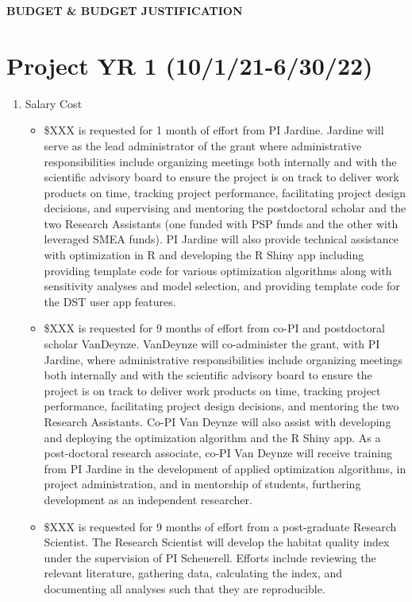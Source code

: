 \begin{center} \textbf{BUDGET \& BUDGET JUSTIFICATION} \end{center}


\section{Project YR 1 (10/1/21-6/30/22)}
\begin{enumerate}
\item Salary Cost
\begin{itemize}
\item  \$XXX is requested for 1 month of effort from PI Jardine. Jardine will serve as the lead administrator of the grant where administrative responsibilities include organizing meetings both internally and with the scientific advisory board to ensure the project is on track to deliver work products on time, tracking project performance, facilitating project design decisions, and supervising and mentoring the postdoctoral scholar and the two Research Assistants (one funded with PSP funds and the other with leveraged SMEA funds). PI Jardine will also provide technical assistance with optimization in R and developing the R Shiny app including providing template code for various optimization algorithms along with sensitivity analyses and model selection, and providing template code for the DST user app features.
\item \$XXX is requested for 9 months of effort from co-PI and postdoctoral scholar VanDeynze. VanDeynze will co-administer the grant, with PI Jardine, where administrative responsibilities include organizing meetings both internally and with the scientific advisory board to ensure the project is on track to deliver work products on time, tracking project performance, facilitating project design decisions, and mentoring the two Research Assistants. Co-PI Van Deynze will also assist with developing and deploying the optimization algorithm and the R Shiny app. As a post-doctoral research associate, co-PI Van Deynze will receive training from PI Jardine in the development of applied optimization algorithms, in project administration, and in mentorship of students, furthering development as an independent researcher. 
\item \$XXX is requested for 9 months of effort from a post-graduate Research Scientist. The Research Scientist will develop the habitat quality index under the supervision of PI Scheuerell. Efforts include reviewing the relevant literature, gathering data, calculating the index, and documenting all analyses such that they are reproducible.

\end{itemize}
\end{enumerate}
